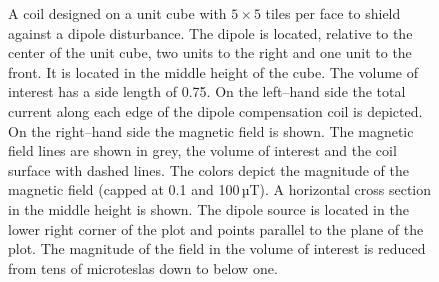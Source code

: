 

\begin{figure}
  \centering
  \quad
  \caption{A coil designed on a unit cube with $5 \times 5$ tiles per face to shield against a dipole disturbance. The dipole is located, relative to the center of the unit cube, two units to the right and one unit to the front. It is located in the middle height of the cube. The volume of interest has a side length of 0.75. On the left--hand side the total current along each edge of the dipole compensation coil is depicted. On the right--hand side the magnetic field is shown. The magnetic field lines are shown in grey, the volume of interest and the coil surface with dashed lines. The colors depict the magnitude of the magnetic field (capped at 0.1 and 100\,µT). A horizontal cross section in the middle height is shown. The dipole source is located in the lower right corner of the plot and points parallel to the plane of the plot. The magnitude of the field in the volume of interest is reduced from tens of microteslas down to below one.}
  \label{fig:showcase}
\end{figure}





